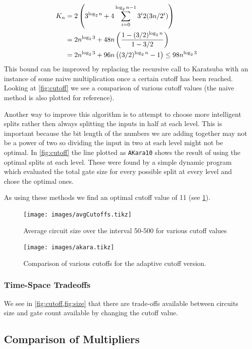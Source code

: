       \begin{align}
        K_n &= 2\left(3^{\log_2 n } + 4 \sum_{i=0}^{\log_2 n - 1} 3^i 2(3n/2^i)\right)\notag\\
            &= 2n^{\log_2 3} + 48n \left(\frac{1- (3/2)^{\log_2 n}}{1-3/2}\right) \notag\\
            &= 2n^{\log_2 3} + 96n \left((3/2)^{\log_2{n}} -1\right) \leq 98 n^{\log_2{3}}
      \end{align}
      This bound can be improved by replacing the recursive call to Karatsuba with an instance of some naive multiplication once a certain cutoff has been reached.
      Looking at \cref{fig:cutoff} we see a comparison of various cutoff values (the naive method is also plotted for reference).

      Another way to improve this algorithm is to attempt to choose more intelligent splits rather then always splitting the inputs in half at each level.
      This is important because the bit length of the numbers we are adding together may not be a power of two so dividing the input in two at each level might not be optimal.
      In \cref{fig:cutoff} the line plotted as \verb+AKara10+ shows the result of using the optimal splits at each level.
      These were found by a simple dynamic program which evaluated the total gate size for every possible split at every level and chose the optimal ones.

      As using these methods we find an optimal cutoff value of 11 (see \cref{fig:cutoffs}).
      \begin{figure}
        \capstart
        \texttt{[image: images/avgCutoffs.tikz]}
        \caption{Average circuit size over the interval 50-500 for various cutoff values}
        \label{fig:cutoffs}
      \end{figure}
      \begin{figure}
        \capstart
        \texttt{[image: images/akara.tikz]}
        \caption{Comparison of various cutoffs for the adaptive cutoff version.}
        \label{fig:aKara}
     \end{figure}

   \subsubsection{Time-Space Tradeoffs}
     We see in \cref{fig:cutoff,fig:size} that there are trade-offs available between circuits size and gate count available by changing the cutoff value.
  \subsection{Comparison of Multipliers}
